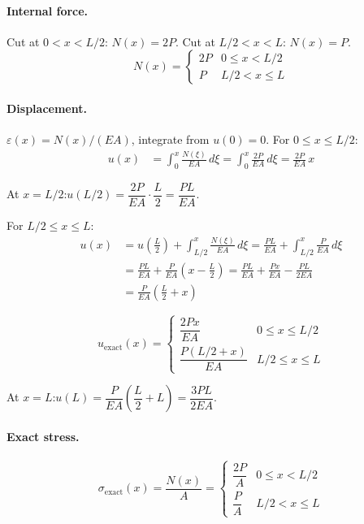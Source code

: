 \documentclass[11pt, a4paper]{article}
\begin{document}
\paragraph{Internal force.}
Cut at $0<x<L/2$: $N(x)=2P$.  Cut at $L/2<x<L$: $N(x)=P$.
\[
N(x) = \begin{cases} 2P & 0 \le x < L/2 \\ P & L/2 < x \le L \end{cases}
\]

\paragraph{Displacement.}
$\varepsilon(x)=N(x)/(EA)$, integrate from $u(0)=0$.  For $0\le x\le L/2$:
\begin{align*}
u(x) &= \int_0^x \frac{N(\xi)}{EA}\,d\xi
      = \int_0^x \frac{2P}{EA}\,d\xi
      = \frac{2P}{EA}\,x
\end{align*}

At $x=L/2$:\quad $u(L/2)=\dfrac{2P}{EA}\cdot\dfrac{L}{2}=\dfrac{PL}{EA}$.

For $L/2\le x\le L$:
\begin{align*}
u(x) &= u\!\left(\frac{L}{2}\right)+\int_{L/2}^x \frac{N(\xi)}{EA}\,d\xi
      = \frac{PL}{EA}+\int_{L/2}^x \frac{P}{EA}\,d\xi \\[6pt]
     &= \frac{PL}{EA}+\frac{P}{EA}\!\left(x-\frac{L}{2}\right)
      = \frac{PL}{EA}+\frac{Px}{EA}-\frac{PL}{2EA} \\[6pt]
     &= \frac{P}{EA}\!\left(\frac{L}{2}+x\right)
\end{align*}

\begin{equation}\label{eq:u_exact}
\boxed{u_{\text{exact}}(x) = \begin{cases} \dfrac{2Px}{EA} & 0 \le x \le L/2 \\[10pt] \dfrac{P(L/2+x)}{EA} & L/2 \le x \le L \end{cases}}
\end{equation}

At $x=L$:\quad $u(L)=\dfrac{P}{EA}\!\left(\dfrac{L}{2}+L\right)=\dfrac{3PL}{2EA}$.

\paragraph{Exact stress.}
\begin{equation}\label{eq:sigma_exact}
\sigma_{\text{exact}}(x)=\frac{N(x)}{A}=\begin{cases} \dfrac{2P}{A} & 0 \le x < L/2 \\[8pt] \dfrac{P}{A} & L/2 < x \le L \end{cases}
\end{equation}
\end{document}
